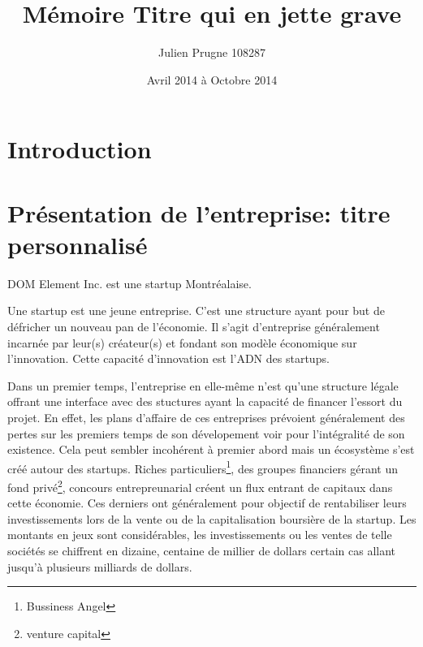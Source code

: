 \documentclass[11pt, a4paper ]{article}
\title{Mémoire Titre qui en jette grave}
\author{Julien Prugne 108287}
\date{Avril 2014 à Octobre 2014}
\let\stdsection\section
\renewcommand\section{\newpage\stdsection}
\begin{document}
	\maketitle
	\tableofcontents

\begin{spacing}{1.5}
	\section{Introduction} %



	\section{Présentation de l'entreprise: titre personnalisé} %

DOM Element Inc. est une startup Montréalaise.

Une startup\cite{theseStartup} est une jeune entreprise. C'est une structure ayant pour but de défricher un nouveau pan de l'économie. Il s'agit d'entreprise généralement incarnée par leur(s) créateur(s) et fondant son modèle économique sur l'innovation. Cette capacité d'innovation est l'ADN des startups.

Dans un premier temps, l'entreprise en elle-même n'est qu'une structure légale offrant une interface avec des stuctures ayant la capacité de financer l'essort du projet. En effet, les plans d'affaire de ces entreprises prévoient généralement des pertes sur les premiers temps de son dévelopement voir pour l'intégralité de son existence. Cela peut sembler incohérent à premier abord mais un écosystème s'est créé autour des startups. Riches particuliers\footnote{Bussiness Angel}, des groupes financiers gérant un fond privé\footnote{venture capital}, concours entrepreunarial créent un flux entrant de capitaux dans cette économie. Ces derniers ont généralement pour objectif de rentabiliser leurs investissements lors de la vente ou de la capitalisation boursière de la startup. Les montants en jeux sont considérables, les investissements ou les ventes de telle sociétés se chiffrent en dizaine, centaine de millier de dollars certain cas allant jusqu'à plusieurs milliards de dollars.


\end{spacing}
\end{document}
